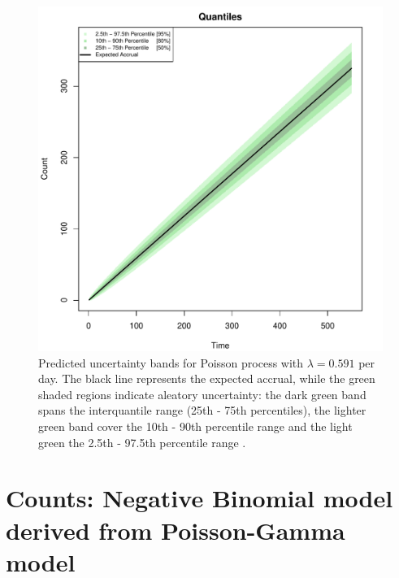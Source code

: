 \begin{figure}
\begin{knitrout}
\color{fgcolor}

{\centering \includegraphics[width=\textwidth-3cm]{figure/ch02_figunnamed-chunk-6-1} 

}


\end{knitrout}
  \caption{Predicted uncertainty bands for Poisson process with $\lambda = 0.591$ per day. The black line represents the expected accrual, while the green shaded regions indicate aleatory uncertainty: the dark green band spans the interquantile range (25th - 75th percentiles), the lighter green band cover the 10th - 90th percentile range and the light green the 2.5th - 97.5th percentile range \citep{spiegelhalter2011visualizing}.}
  \label{fig:2_5}
\end{figure}

\section{Counts: Negative Binomial model derived from Poisson-Gamma model}


